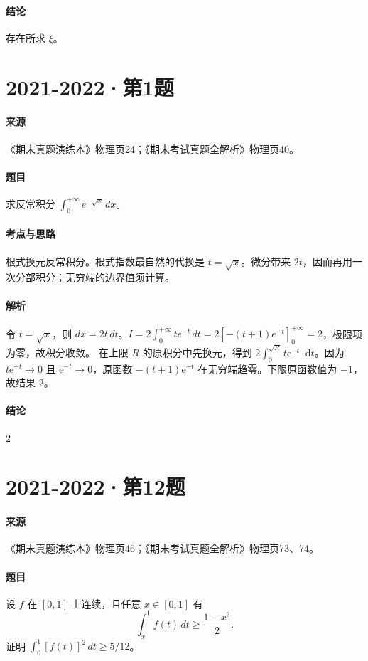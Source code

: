 \documentclass[UTF8,fontset=fandol,12pt,oneside,openany]{ctexrep}
\newcommand{\dd}{\mathop{}\!\mathrm d}
\newcommand{\ee}{\mathrm e}
\theoremstyle{definition}
\begin{document}
\paragraph{结论}
存在所求 $\xi$。

\par\addvspace{18pt}\noindent\begin{minipage}{\linewidth}
\section{2021-2022·第1题}
\label{exam:11:q11}
\paragraph{来源} 《期末真题演练本》物理页24；《期末考试真题全解析》物理页40。
\paragraph{题目}
求反常积分 $\int_0^{+\infty}e^{-\sqrt x}\,dx$。
\end{minipage}\par
\paragraph{考点与思路}
根式换元反常积分。根式指数最自然的代换是 $t=\sqrt x$。微分带来 $2t$，因而再用一次分部积分；无穷端的边界值须计算。
\paragraph{解析}
令 $t=\sqrt x$，则 $dx=2t\,dt$。$I=2\int_0^{+\infty}te^{-t}\,dt=2[-(t+1)e^{-t}]_0^{+\infty}=2$，极限项为零，故积分收敛。
在上限 $R$ 的原积分中先换元，得到 $2\int_0^{\sqrt R}t\ee^{-t}\dd t$。因为 $t\ee^{-t}\to0$ 且 $\ee^{-t}\to0$，原函数 $-(t+1)\ee^{-t}$ 在无穷端趋零。下限原函数值为 $-1$，故结果 $2$。
\paragraph{结论}
$2$

\par\addvspace{18pt}\noindent\begin{minipage}{\linewidth}
\section{2021-2022·第12题}
\label{exam:11:q12}
\paragraph{来源} 《期末真题演练本》物理页46；《期末考试真题全解析》物理页73、74。
\paragraph{题目}
设 $f$ 在 $[0,1]$ 上连续，且任意 $x\in[0,1]$ 有
\[\int_x^1f(t)\,dt\ge\frac{1-x^3}2.\]
证明 $\int_0^1[f(t)]^2\,dt\ge5/12$。
\end{minipage}\par
\end{document}

